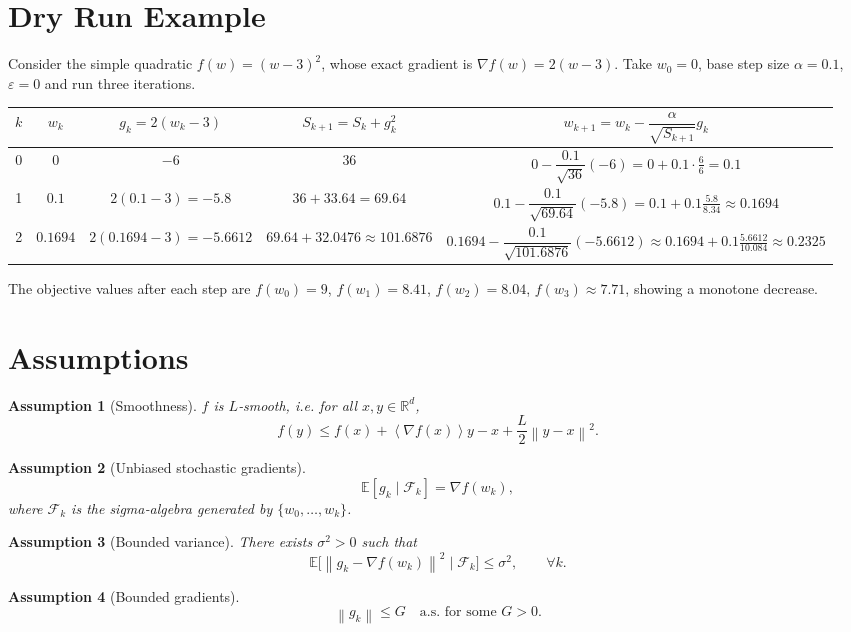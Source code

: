 \documentclass{article}
\newtheorem{assumption}{Assumption}
\newcommand{\E}{\mathbb{E}}
\newcommand{\norm}[1]{\left\lVert#1\right\rVert}
\newcommand{\inner}[1]{\left\langle#1\right\rangle}
\begin{document}
\section*{Dry Run Example}
Consider the simple quadratic $f(w)=(w-3)^2$, whose exact gradient is $\nabla f(w)=2(w-3)$.  
Take $w_0=0$, base step size $\alpha=0.1$, $\varepsilon=0$ and run three iterations.

\begin{center}
\begin{tabular}{c|c|c|c|c}
$k$ & $w_k$ & $g_k=2(w_k-3)$ & $S_{k+1}=S_k+g_k^{2}$ & $w_{k+1}=w_k-\dfrac{\alpha}{\sqrt{S_{k+1}}}g_k$\\\hline
0 & $0$ & $-6$ & $36$ & $0-\dfrac{0.1}{\sqrt{36}}(-6)=0+0.1\cdot\frac{6}{6}=0.1$\\
1 & $0.1$ & $2(0.1-3)=-5.8$ & $36+33.64=69.64$ & $0.1-\dfrac{0.1}{\sqrt{69.64}}(-5.8)
=0.1+0.1\frac{5.8}{8.34}\approx0.1694$\\
2 & $0.1694$ & $2(0.1694-3)=-5.6612$ & $69.64+32.0476\approx101.6876$ &
$0.1694-\dfrac{0.1}{\sqrt{101.6876}}(-5.6612)
\approx0.1694+0.1\frac{5.6612}{10.084}\approx0.2325$
\end{tabular}
\end{center}
The objective values after each step are $f(w_0)=9$, $f(w_1)=8.41$, $f(w_2)=8.04$, $f(w_3)\approx7.71$, showing a monotone decrease.

\section*{Assumptions}
\begin{assumption}[Smoothness]\label{ass:smooth}
$f$ is $L$‑smooth, i.e. for all $x,y\in\mathbb{R}^{d}$,
\[
f(y)\le f(x)+\inner{\nabla f(x)}{y-x}+\frac{L}{2}\norm{y-x}^{2}.
\tag{A1}
\]
\end{assumption}
\begin{assumption}[Unbiased stochastic gradients]\label{ass:unbiased}
\[
\E[g_k\mid\mathcal{F}_{k}]=\nabla f(w_k),
\tag{A2}
\]
where $\mathcal{F}_{k}$ is the sigma‑algebra generated by $\{w_0,\dots,w_k\}$.
\end{assumption}
\begin{assumption}[Bounded variance]\label{ass:variance}
There exists $\sigma^{2}>0$ such that
\[
\E\!\big[\norm{g_k-\nabla f(w_k)}^{2}\mid\mathcal{F}_{k}\big]\le\sigma^{2},
\qquad\forall k.
\tag{A3}
\]
\end{assumption}
\begin{assumption}[Bounded gradients]\label{ass:bounded}
\[
\norm{g_k}\le G\quad\text{a.s. for some }G>0.
\tag{A4}
\]
\end{assumption}
\end{document}
